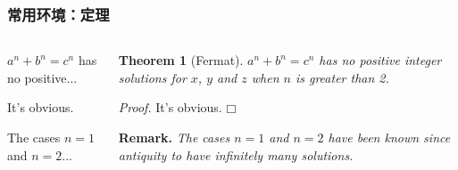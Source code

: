 \begin{frame}[fragile]
\frametitle{常用环境：定理}
\begin{columns}
\begin{column}{0.57\textwidth}
  \begin{texcode}[gobble=4, moredelim={[is][emphstyle]{!}{!}}, moretexcs={\newtheorem*},
      emph={[2]amsthm}]
    \usepackage{amsthm}
    \newtheorem{theorem}{Theorem}
    \newtheorem*{remark}{Remark} %

    \begin{!theorem!}[Fermat]
      $a^n+b^n=c^n$ has no positive...
    \end{!theorem!}
    \begin{!proof!}
      It's obvious.
    \end{!proof!}
    \begin{!remark!}
      The cases $n=1$ and $n=2$...
    \end{!remark!}
  \end{texcode}
\end{column}
\pause
\begin{column}{0.33\textwidth}
  \footnotesize
  \setlength{\parskip}{0.5em}
  \setlength{\parindent}{0pt}

  \textbf{Theorem 1} (Fermat). \emph{$a^n+b^n=c^n$ has no positive integer solutions
    for $x$, $y$ and $z$ when $n$ is greater than 2.}

  \textit{Proof.} It's obvious. \hfill $\mdlgwhtsquare$

  \textbf{Remark.} \emph{The cases $n=1$ and $n=2$ have been known since antiquity
    to have infinitely many solutions.}
\end{column}
\end{columns}
\end{frame}

